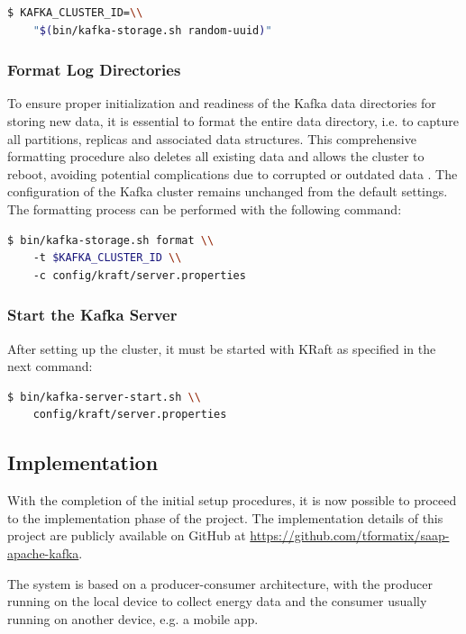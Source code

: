 \begin{lstlisting}[language=bash]
$ KAFKA_CLUSTER_ID=\\
    "$(bin/kafka-storage.sh random-uuid)"
\end{lstlisting}

\subsubsection{Format Log Directories} To ensure proper initialization and readiness of the Kafka data directories for storing new data, it is essential to format the entire data directory, i.e. to capture all partitions, replicas and associated data structures. This comprehensive formatting procedure also deletes all existing data and allows the cluster to reboot, avoiding potential complications due to corrupted or outdated data \cite{shapira2021kafka}. The configuration of the Kafka cluster remains unchanged from the default settings. The formatting process can be performed with the following command:

\begin{lstlisting}[language=bash]
$ bin/kafka-storage.sh format \\
    -t $KAFKA_CLUSTER_ID \\
    -c config/kraft/server.properties
\end{lstlisting}

\subsubsection{Start the Kafka Server} After setting up the cluster, it must be started with KRaft as specified in the next command:

\begin{lstlisting}[language=bash]
$ bin/kafka-server-start.sh \\
    config/kraft/server.properties
\end{lstlisting}

\subsection{Implementation}

With the completion of the initial setup procedures, it is now possible to proceed to the implementation phase of the project. The implementation details of this project are publicly available on GitHub at \url{https://github.com/tformatix/saap-apache-kafka}.

The system is based on a producer-consumer architecture, with the producer running on the local device to collect energy data and the consumer usually running on another device, e.g. a mobile app.

